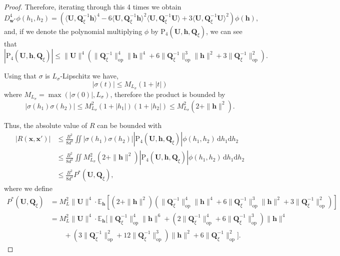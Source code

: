 \begin{proof}
    Therefore, iterating through this 4 times we obtain 
    \[
        D_{\bm w^*}^4 \phi(h_1, h_2) = \left(\langle \bm U, \bm Q_\xi^{-1} \bm h\rangle^4 - 6\langle \bm U, \bm Q_\xi^{-1} \bm h\rangle^2 \langle \bm U, \bm Q_\xi^{-1} \bm U\rangle + 3\langle \bm U, \bm Q_\xi^{-1} \bm U\rangle^2  \right)\phi(\bm h),
    \]
    and, if we denote the polynomial multiplying $\phi$ by $\mathrm P_4(\bm U, \bm h, \bm Q_{\xi})$, we can see that
    \[
        |\mathrm P_4(\bm U, \bm h, \bm Q_{\xi})| \leq \|\bm U\|^4 \left(\|\bm Q^{-1}_\xi\|^4_{\text{op}}\|\bm h\|^4 + 6 \|\bm Q^{-1}_\xi\|^3_{\text{op}}\|\bm h\|^2 + 3\|\bm Q^{-1}_\xi\|^2_{\text{op}}\right).
    \]

    Using that $\sigma$ is $L_{\sigma}$-Lipschitz we have,
    \[
        |\sigma(t)| \le M_{L_{\sigma}}(1 + |t|)
    \]
    where $M_{L_{\sigma}} = \max(|\sigma(0)|, L_{\sigma})$, therefore the product is bounded by
    \[
        |\sigma(h_1)\sigma(h_2)| \le M_{L_{\sigma}}^2(1 + |h_1|)(1 + |h_2|) \leq M_{L_{\sigma}}^2(2+ \|\bm h\|^2).
    \]

    Thus, the absolute value of $R$ can be bounded with
    \begin{align*}
        |R(\bm x, \bm x')| &\leq \frac{B^2}{8d^2}\iint |\sigma(h_1)\sigma(h_2)| |\mathrm P_4(\bm U, \bm h, \bm Q_{\xi})| \phi(h_1, h_2) \, \mathrm d h_1 \mathrm d h_2\\
        & \leq \frac{B^2}{8d^2}\iint M_{L_{\sigma}}^2(2 + \|\bm h\|^2)  |\mathrm P_4(\bm U, \bm h, \bm Q_{\xi})| \phi(h_1, h_2) \, \mathrm d h_1 \mathrm d h_2\\
        &\leq \frac{B^2}{8d^2}P^*(\bm U, \bm Q_{\xi}),
    \end{align*}
    where we define
    \begin{align*}
        P^*(\bm U, \bm Q_{\xi}) &= M_L^2 \|\bm U\|^4 \cdot \mathbb{E}_{\bm h} \left[ (2 + \|\bm h\|^2)(\|\bm Q_\xi^{-1}\|_{\text{op}}^4\|\bm h\|^4 + 6\|\bm Q_\xi^{-1}\|_{\text{op}}^3\|\bm h\|^2 + 3\|\bm Q_\xi^{-1}\|_{\text{op}}^2) \right]\\
        &=M_L^2 \|\bm U\|^4 \cdot \mathbb{E}_{\bm h} \Big[ \|\bm Q_\xi^{-1}\|_{\text{op}}^4\|\bm h\|^6 + (2\|\bm Q_\xi^{-1}\|_{\text{op}}^4 + 6\|\bm Q_\xi^{-1}\|_{\text{op}}^3)\|\bm h\|^4 \\
        &\qquad +(3\|\bm Q_\xi^{-1}\|_{\text{op}}^2 + 12\|\bm Q_\xi^{-1}\|_{\text{op}}^3)\|\bm h\|^2 + 6\|\bm Q_\xi^{-1}\|_{\text{op}}^2 \Big].
    \end{align*}


\end{proof}
